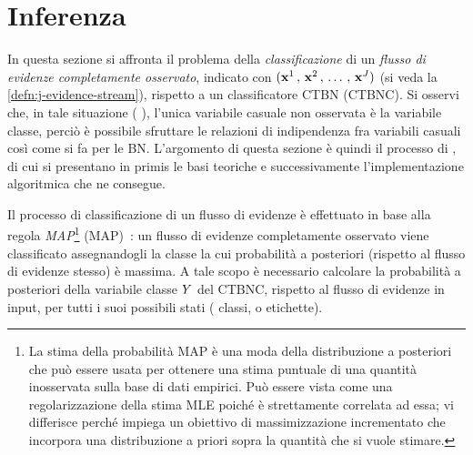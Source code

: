 \cleardoublepage
\section{Inferenza}\label{sec:inference-ctbnc}
In questa sezione si affronta il problema della \emph{classificazione} di un \emph{flusso di evidenze completamente osservato}, indicato con $(\mathbf{x}^1\,,\,\mathbf{x}^2\,,\,\dotsc\,,\,\mathbf{x}^{J})$ (si veda la \autoref{defn:j-evidence-stream}), rispetto a un classificatore \acs{CTBN} (\acs{CTBNC}). Si osservi che, in tale situazione (\ie{} \emph{}), l'unica variabile casuale non osservata è la variabile classe, perciò è possibile sfruttare le relazioni di indipendenza fra variabili casuali così come si fa per le \acl{BN}. L'argomento di questa sezione è quindi il processo di \emph{}, di cui si presentano in primis le basi teoriche e successivamente l'implementazione algoritmica che ne consegue.

Il processo di classificazione di un flusso di evidenze è effettuato in base alla regola \emph{\acl{MAP}}\footnote{La stima della probabilità \acf{MAP} è una moda della distribuzione a posteriori che può essere usata per ottenere una stima puntuale di una quantità inosservata sulla base di dati empirici. Può essere vista come una regolarizzazione della stima \acf{MLE} poiché è strettamente correlata ad essa; vi differisce perché impiega un obiettivo di massimizzazione incrementato che incorpora una distribuzione a priori sopra la quantità che si vuole stimare.} (\acs{MAP})~\citep[si veda][]{Stella2012}: un flusso di evidenze completamente osservato viene classificato assegnandogli la classe la cui probabilità a posteriori (rispetto al flusso di evidenze stesso) è massima. A tale scopo è necessario calcolare la probabilità a posteriori della variabile classe $\mathnormal{Y}$ del \acs{CTBNC}, rispetto al flusso di evidenze in input, per tutti i suoi possibili stati (\ie{} classi, o etichette).

